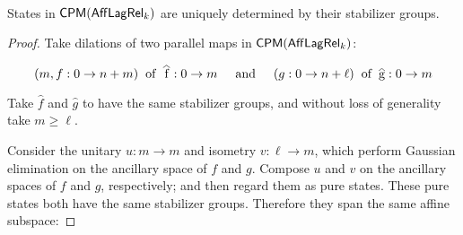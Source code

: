 \begin{proposition}~\\
\label{prop:uniqueness}
States in $\mathsf{CPM}(\mathsf{Aff}\mathsf{Lag}\mathsf{Rel}_k)$ are uniquely determined by their stabilizer groups.
\end{proposition}
\begin{proof}

Take dilations of two parallel maps in $\mathsf{CPM}(\mathsf{Aff}\mathsf{Lag}\mathsf{Rel}_k)$:

$$
(m,f:0\to n+m) \hspace*{.2cm}  
\text{of} \hspace*{.2cm} \hat f:0\to m 
\hspace*{.5cm}
\text{and}
\hspace*{.5cm}
(g:0\to n+\ell)
\hspace*{.2cm}  \text{of} \hspace*{.2cm}
\hat g:0\to m
$$ 

Take  $\hat f$ and $\hat g$ to have the same stabilizer groups, and without loss of generality take $m\geq \ell$. 

Consider the unitary  $u:m\to m$  and isometry $v:\ell\to m$, which perform Gaussian elimination on the ancillary space of $f$ and $g$.  Compose $u$ and $v$ on the ancillary spaces of $f$ and $g$, respectively; and then regard them as pure states.  These pure states both have the same stabilizer groups.  Therefore they span the same affine subspace:


\end{proof}
